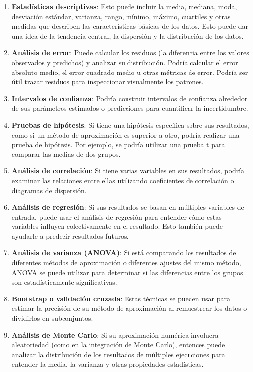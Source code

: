 \documentclass[a4paper]{article}
\begin{document}
\begin{enumerate}
  \item \textbf{Estadísticas descriptivas}: Esto puede incluir la media, mediana, moda, desviación estándar, varianza, rango, mínimo, máximo, cuartiles y otras medidas que describen las características básicas de los datos. Esto puede dar una idea de la tendencia central, la dispersión y la distribución de los datos.
  \item \textbf{Análisis de error}: Puede calcular los residuos (la diferencia entre los valores observados y predichos) y analizar su distribución. Podría calcular el error absoluto medio, el error cuadrado medio u otras métricas de error. Podría ser útil trazar residuos para inspeccionar visualmente los patrones.
  \item \textbf{Intervalos de confianza}: Podría construir intervalos de confianza alrededor de sus parámetros estimados o predicciones para cuantificar la incertidumbre.
  \item \textbf{Pruebas de hipótesis}: Si tiene una hipótesis específica sobre sus resultados, como si un método de aproximación es superior a otro, podría realizar una prueba de hipótesis. Por ejemplo, se podría utilizar una prueba t para comparar las medias de dos grupos.
  \item \textbf{Análisis de correlación}: Si tiene varias variables en sus resultados, podría examinar las relaciones entre ellas utilizando coeficientes de correlación o diagramas de dispersión.
  \item \textbf{Análisis de regresión}: Si sus resultados se basan en múltiples variables de entrada, puede usar el análisis de regresión para entender cómo estas variables influyen colectivamente en el resultado. Esto también puede ayudarle a predecir resultados futuros.
  \item \textbf{Análisis de varianza (ANOVA)}: Si está comparando los resultados de diferentes métodos de aproximación o diferentes ajustes del mismo método, ANOVA se puede utilizar para determinar si las diferencias entre los grupos son estadísticamente significativas.
  \item \textbf{Bootstrap o validación cruzada}: Estas técnicas se pueden usar para estimar la precisión de su método de aproximación al remuestrear los datos o dividirlos en subconjuntos.
  \item \textbf{Análisis de Monte Carlo}: Si su aproximación numérica involucra aleatoriedad (como en la integración de Monte Carlo), entonces puede analizar la distribución de los resultados de múltiples ejecuciones para entender la media, la varianza y otras propiedades estadísticas.
\end{enumerate}
\end{document}
